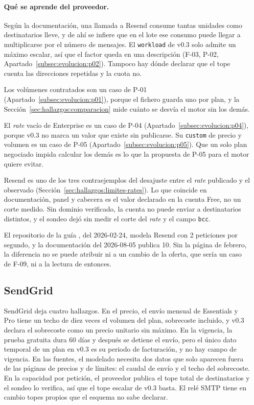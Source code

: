 \paragraph{Qué se aprende del proveedor.} Según la documentación, una llamada a Resend
consume tantas unidades como destinatarios lleve, y de ahí se infiere que en el lote ese
consumo puede llegar a multiplicarse por el número de mensajes. El \texttt{workload} de v0.3 solo admite un
máximo escalar, así que el factor queda en una descripción (F-03, P-02,
Apartado~\ref{subsec:evolucion:p02}). Tampoco hay dónde declarar que el tope cuenta las
direcciones repetidas y la cuota no.

Los volúmenes contratados son un caso de P-01 (Apartado~\ref{subsec:evolucion:p01}),
porque el fichero guarda uno por plan, y la Sección~\ref{sec:hallazgos:comparacion} mide
cuánto se desvía el motor sin los demás.

El \textit{rate} vacío de Enterprise es un caso de P-04 (Apartado~\ref{subsec:evolucion:p04}),
porque v0.3 no marca un valor que existe sin publicarse. Su \texttt{custom} de precio y
volumen es un caso de P-05 (Apartado~\ref{subsec:evolucion:p05}). Que un solo plan
negociado impida calcular los demás es lo que la propuesta de P-05 para el motor quiere
evitar.

Resend es uno de los tres contraejemplos del desajuste entre el \textit{rate} publicado y
el observado (Sección~\ref{sec:hallazgos:limites-rates}). Lo que coincide en documentación, panel y cabecera es el valor declarado en la cuenta Free, no un corte medido. Sin dominio verificado, la cuenta no puede enviar a destinatarios distintos, y el sondeo dejó sin medir el corte del \textit{rate} y el campo \texttt{bcc}.

El repositorio de la guía \citep{apisconsumptionmodel}, del 2026-02-24,
modela Resend con 2 peticiones por segundo, y la documentación del 2026-08-05 publica
10. Sin la página de febrero, la diferencia no se puede atribuir ni a un cambio de la
oferta, que sería un caso de F-09, ni a la lectura de entonces.

\subsection{SendGrid}
\label{subsec:hallazgos:sendgrid}

SendGrid \citep{sendgridpricing,sendgriddocs} deja cuatro hallazgos. En el
precio, el envío mensual de Essentials y Pro tiene un techo de
diez veces el volumen del plan, sobrecoste incluido, y v0.3 declara el
sobrecoste como un precio unitario sin máximo. En la vigencia, la prueba
gratuita dura 60 días y después se detiene el envío, pero el único dato
temporal de un plan en v0.3 es su periodo de facturación, y no hay campo de
vigencia. En las fuentes, el modelado necesita dos datos que solo aparecen
fuera de las páginas de precios y de límites: el caudal de envío y el techo
del sobrecoste. En la capacidad por petición, el proveedor publica el tope total
de destinatarios y el sondeo lo verifica, así que el tope escalar de v0.3
basta. El relé SMTP tiene en cambio topes propios que el esquema no sabe
declarar.

